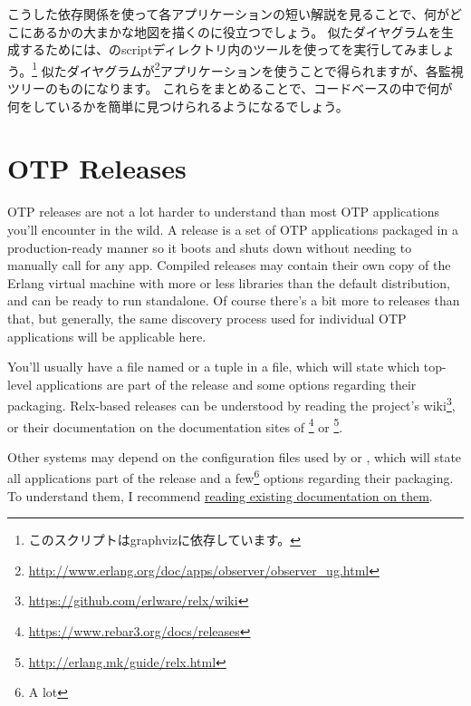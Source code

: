 こうした依存関係を使って各アプリケーションの短い解説を見ることで、何がどこにあるかの大まかな地図を描くのに役立つでしょう。
似たダイヤグラムを生成するためには、のscriptディレクトリ内のツールを使ってを実行してみましょう。\footnote{このスクリプトはgraphvizに依存しています。}
似たダイヤグラムが\footnote{\href{http://www.erlang.org/doc/apps/observer/observer\_ug.html}{http://www.erlang.org/doc/apps/observer/observer\_ug.html}}アプリケーションを使うことで得られますが、各監視ツリーのものになります。
これらをまとめることで、コードベースの中で何が何をしているかを簡単に見つけられるようになるでしょう。

\FloatBarrier

\section{OTP Releases}
\label{sec:dive-otp-releases}

OTP releases are not a lot harder to understand than most OTP applications you'll encounter in the wild. A release is a set of OTP applications packaged in a production-ready manner so it boots and shuts down without needing to manually call  for any app. Compiled releases may contain their own copy of the Erlang virtual machine with more or less libraries than the default distribution, and can be ready to run standalone. Of course there's a bit more to releases than that, but generally, the same discovery process used for individual OTP applications will be applicable here.

You'll usually have a file named  or a  tuple in a  file, which will state which top-level applications are part of the release and some options regarding their packaging. Relx-based releases can be understood by reading the project's wiki\footnote{\href{https://github.com/erlware/relx/wiki}{https://github.com/erlware/relx/wiki}}, or their documentation on the documentation sites of \footnote{\href{https://www.rebar3.org/docs/releases}{https://www.rebar3.org/docs/releases}} or \footnote{\href{http://erlang.mk/guide/relx.html}{http://erlang.mk/guide/relx.html}}.

Other systems may depend on the configuration files used by  or , which will state all applications part of the release and a few\footnote{A lot} options regarding their packaging. To understand them, I recommend \href{http://learnyousomeerlang.com/release-is-the-word}{reading existing documentation on them}.

